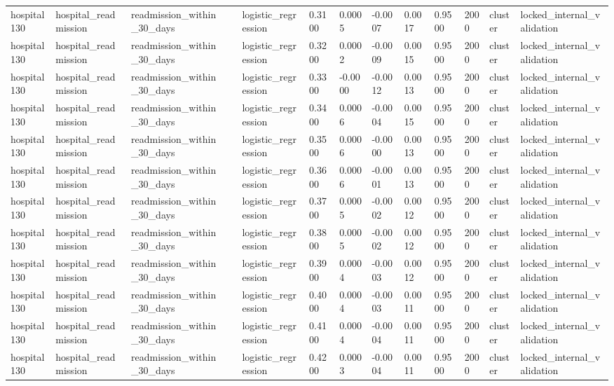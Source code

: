 \begin{tabular}{lllllllllllll}
hospital130 & hospital\_readmission & readmission\_within\_30\_days &  & logistic\_regression & 0.3100 & 0.0005 & -0.0007 & 0.0017 & 0.9500 & 2000 & cluster & locked\_internal\_validation \\
hospital130 & hospital\_readmission & readmission\_within\_30\_days &  & logistic\_regression & 0.3200 & 0.0002 & -0.0009 & 0.0015 & 0.9500 & 2000 & cluster & locked\_internal\_validation \\
hospital130 & hospital\_readmission & readmission\_within\_30\_days &  & logistic\_regression & 0.3300 & -0.0000 & -0.0012 & 0.0013 & 0.9500 & 2000 & cluster & locked\_internal\_validation \\
hospital130 & hospital\_readmission & readmission\_within\_30\_days &  & logistic\_regression & 0.3400 & 0.0006 & -0.0004 & 0.0015 & 0.9500 & 2000 & cluster & locked\_internal\_validation \\
hospital130 & hospital\_readmission & readmission\_within\_30\_days &  & logistic\_regression & 0.3500 & 0.0006 & -0.0000 & 0.0013 & 0.9500 & 2000 & cluster & locked\_internal\_validation \\
hospital130 & hospital\_readmission & readmission\_within\_30\_days &  & logistic\_regression & 0.3600 & 0.0006 & -0.0001 & 0.0013 & 0.9500 & 2000 & cluster & locked\_internal\_validation \\
hospital130 & hospital\_readmission & readmission\_within\_30\_days &  & logistic\_regression & 0.3700 & 0.0005 & -0.0002 & 0.0012 & 0.9500 & 2000 & cluster & locked\_internal\_validation \\
hospital130 & hospital\_readmission & readmission\_within\_30\_days &  & logistic\_regression & 0.3800 & 0.0005 & -0.0002 & 0.0012 & 0.9500 & 2000 & cluster & locked\_internal\_validation \\
hospital130 & hospital\_readmission & readmission\_within\_30\_days &  & logistic\_regression & 0.3900 & 0.0004 & -0.0003 & 0.0012 & 0.9500 & 2000 & cluster & locked\_internal\_validation \\
hospital130 & hospital\_readmission & readmission\_within\_30\_days &  & logistic\_regression & 0.4000 & 0.0004 & -0.0003 & 0.0011 & 0.9500 & 2000 & cluster & locked\_internal\_validation \\
hospital130 & hospital\_readmission & readmission\_within\_30\_days &  & logistic\_regression & 0.4100 & 0.0004 & -0.0004 & 0.0011 & 0.9500 & 2000 & cluster & locked\_internal\_validation \\
hospital130 & hospital\_readmission & readmission\_within\_30\_days &  & logistic\_regression & 0.4200 & 0.0003 & -0.0004 & 0.0011 & 0.9500 & 2000 & cluster & locked\_internal\_validation \\

\end{tabular}
